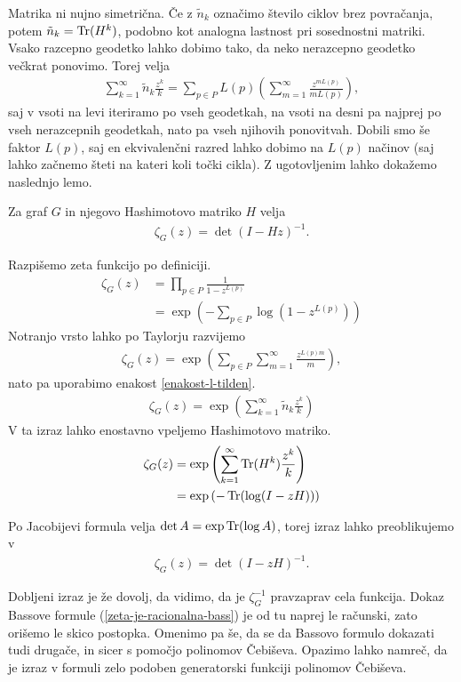 Matrika ni nujno simetrična. Če z \(\tilde{n}_k\) označimo število ciklov brez povračanja, potem \(\tilde{n}_k = \operatorname{Tr}(H^k)\), podobno kot analogna lastnost pri sosednostni matriki. Vsako razcepno geodetko lahko dobimo tako, da neko nerazcepno geodetko večkrat ponovimo. Torej velja
\begin{align}\label{enakost-l-tilden}
    \sum_{k=1}^\infty \tilde{n}_k \frac{z^k}{k} = \sum_{p\in P} L(p)\left(\sum_{m=1}^\infty \frac{z^{mL(p)}}{mL(p)}\right),
\end{align}
saj v vsoti na levi iteriramo po vseh geodetkah, na vsoti na desni pa najprej po vseh nerazcepnih geodetkah, nato pa vseh njihovih ponovitvah. Dobili smo še faktor \(L(p)\), saj en ekvivalenčni razred lahko dobimo na \(L(p)\) načinov (saj lahko začnemo šteti na kateri koli točki cikla). Z ugotovljenim lahko dokažemo naslednjo lemo.

\begin{lema}
    Za graf \(G\) in njegovo Hashimotovo matriko \(H\) velja
    \begin{align*}
        \zeta_G(z) = \det(I-Hz)^{-1}.
    \end{align*}
\end{lema}
\begin{dokaz}
    Razpišemo zeta funkcijo po definiciji.
    \begin{align*}
        \zeta_G(z) &= \prod_{p\in P}\frac{1}{1-z^{L(p)}} \\
        &= \exp\left(-\sum_{p\in P}\log(1-z^{L(p)})\right)
    \end{align*}
    Notranjo vrsto lahko po Taylorju razvijemo
    \begin{align*}
        \zeta_G(z) =\exp\left(\sum_{p\in P}\sum_{m=1}^\infty \frac{z^{L(p)m}}{m}\right),
    \end{align*}
    nato pa uporabimo enakost \ref{enakost-l-tilden}.
    \begin{align*}
        \zeta_G(z) =\exp\left(\sum_{k=1}^\infty \tilde{n}_k \frac{z^k}{k}\right)
    \end{align*}
    V ta izraz lahko enostavno vpeljemo Hashimotovo matriko.
    \begin{align*}
        \zeta_G(z) &= \exp\left(\sum_{k=1}^\infty \operatorname{Tr}(H^k)\frac{z^k}{k}\right)\\
        &= \exp\left(-\operatorname{Tr}(\log(I - zH))\right)
    \end{align*}

    Po Jacobijevi formula velja \(\det A = \exp \operatorname{Tr}(\log A)\), torej izraz lahko preoblikujemo v
    \begin{align*}
        \zeta_G(z) = \det(I-zH)^{-1}.
    \end{align*}
\end{dokaz}
Dobljeni izraz je že dovolj, da vidimo, da je \(\zeta_G^{-1}\) pravzaprav cela funkcija. Dokaz Bassove formule (\ref{zeta-je-racionalna-bass}) je od tu naprej le računski, zato orišemo le skico postopka. Omenimo pa še, da se da Bassovo formulo dokazati tudi drugače, in sicer s pomočjo polinomov Čebiševa. Opazimo lahko namreč, da je izraz v formuli zelo podoben generatorski funkciji polinomov Čebiševa.

